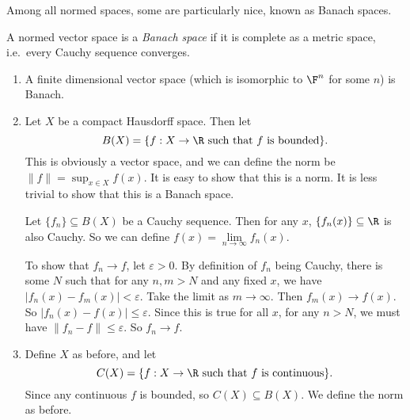 \documentclass[a4paper]{article}
\begin{document}
Among all normed spaces, some are particularly nice, known as Banach spaces.
\begin{defi}
  A normed vector space is a \emph{Banach space} if it is complete as a metric space, i.e.\ every Cauchy sequence converges.
\end{defi}

\begin{eg}\leavevmode
  \begin{enumerate}
    \item A finite dimensional vector space (which is isomorphic to $\F^n$ for some $n$) is Banach.
    \item Let $X$ be a compact Hausdorff space. Then let
      \[
        B(X) = \{f: X\to \R\text{ such that }f\text{ is bounded}\}.
      \]
      This is obviously a vector space, and we can define the norm be $\|f\| = \sup_{x\in X}f(x)$. It is easy to show that this is a norm. It is less trivial to show that this is a Banach space.

      Let $\{f_n\}\subseteq B(X)$ be a Cauchy sequence. Then for any $x$, $\{f_n(x)\}\subseteq \R$ is also Cauchy. So we can define $f(x) = \lim\limits_{n \to \infty}f_n(x)$.

      To show that $f_n \to f$, let $\varepsilon > 0$. By definition of $f_n$ being Cauchy, there is some $N$ such that for any $n, m > N$ and any fixed $x$, we have $|f_n(x) - f_m(x)| < \varepsilon$. Take the limit as $m \to \infty$. Then $f_m(x) \to f(x)$. So $|f_n(x) - f(x)| \leq \varepsilon$. Since this is true for all $x$, for any $n > N$, we must have $\|f_n - f\| \leq \varepsilon$. So $f_n \to f$.

    \item Define $X$ as before, and let
      \[
        C(X) = \{f: X\to \R\text{ such that }f\text{ is continuous}\}.
      \]
      Since any continuous $f$ is bounded, so $C(X) \subseteq B(X)$. We define the norm as before.


\end{enumerate}
\end{eg}
\end{document}
